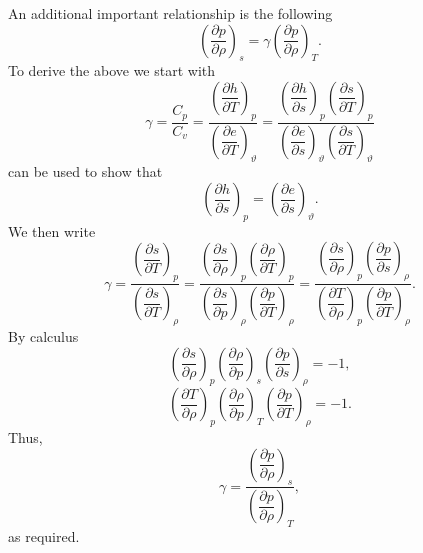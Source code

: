 \documentclass[oneside,a4paper,11pt]{report}
\begin{document}
An additional important relationship is the following
\begin{equation}
\label{eq:thermo_relationship_for_sos}
    \left(\frac{\partial p}{\partial \rho} \right)_s = \gamma \left ( \frac{\partial p}{\partial \rho} \right)_T.
\end{equation}
To derive the above we start with
\begin{equation}
    \gamma = \frac{C_p}{C_v} = \frac{ \left(\dfrac{\partial h}{\partial T}\right)_p }{ \left ( \dfrac{\partial e}{\partial T} \right)_\vartheta } = \frac{ \left(\dfrac{\partial h}{\partial s}\right)_p \left(\dfrac{\partial s}{\partial T}\right)_p }{ \left ( \dfrac{\partial e}{\partial s} \right)_\vartheta \left ( \dfrac{\partial s}{\partial T} \right)_\vartheta}
\end{equation}
 can be used to show that 
\begin{equation}
    \left(\dfrac{\partial h}{\partial s}\right)_p = \left ( \dfrac{\partial e}{\partial s} \right)_\vartheta .
\end{equation}
We then write
\begin{equation}
\gamma = \frac{ \left( \dfrac{\partial s}{\partial T} \right)_p}{ \left( \dfrac{\partial s}{\partial T} \right)_\rho } = \frac{ \left(\dfrac{\partial s}{\partial \rho} \right)_p \left(\dfrac{\partial \rho}{\partial T} \right)_p }{ \left(\dfrac{\partial s}{\partial p} \right)_\rho \left(\dfrac{\partial p}{\partial T} \right)_\rho} = \frac{ \left(\dfrac{\partial s}{\partial \rho} \right)_p \left(\dfrac{\partial p}{\partial s} \right)_\rho }{ \left(\dfrac{\partial T}{\partial \rho} \right)_p \left(\dfrac{\partial p}{\partial T} \right)_\rho}.
\end{equation}
By calculus
\begin{equation}
    \left( \frac{\partial s}{\partial \rho} \right)_p \left( \frac{\partial \rho}{\partial p} \right)_s \left( \frac{\partial p}{\partial s} \right)_\rho = -1,
\end{equation}
\begin{equation}
    \left( \frac{\partial T}{\partial \rho} \right)_p \left( \frac{\partial \rho}{\partial p} \right)_T \left( \frac{\partial p}{\partial T} \right)_\rho = -1.
\end{equation}
Thus,
\begin{equation}
    \gamma = \frac{ \left( \dfrac{\partial p}{\partial \rho} \right)_s }{\left( \dfrac{\partial p}{\partial \rho} \right)_T},
\end{equation}
as required.
\end{document}
